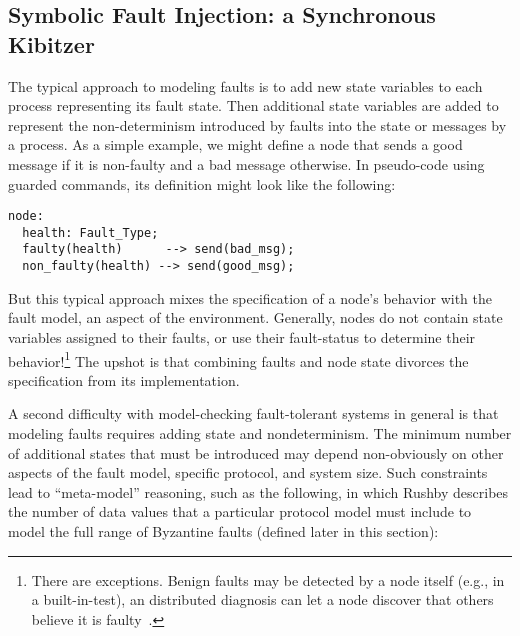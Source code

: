 \documentclass{llncs/llncs}
\newcommand{\lee}[1]{ } %
\newcommand{\lee}[1]{ {\color{blue}$<$lee: #1$>$} } %
\begin{document}

\subsection{Symbolic Fault Injection: a Synchronous Kibitzer}\label{sec:kibitzer}
The typical approach to modeling faults is to add new state variables to each process representing its fault state. Then additional state variables are added to represent the non-determinism introduced by faults into the state or messages by a process. As a simple example, we might define a node that sends a good message if it is non-faulty and a bad message otherwise. In pseudo-code using guarded commands, its definition might look like the following:

\small
\begin{verbatim}
node:
  health: Fault_Type;
  faulty(health)      --> send(bad_msg);
  non_faulty(health) --> send(good_msg);
\end{verbatim}
\normalsize


\noindent
But this typical approach mixes the specification of a node's behavior with the fault model, an aspect of the environment. Generally, nodes do not contain state variables assigned to their faults, or use their fault-status to determine their behavior!\footnote{There are exceptions. Benign faults may be detected by a node itself (e.g., in a built-in-test), an distributed diagnosis can let a node discover that others believe it is faulty~\cite{}.} The upshot is that combining faults and node state divorces the specification from its implementation.

A second difficulty with model-checking fault-tolerant systems in general is that modeling faults requires adding state and nondeterminism. The minimum number of additional states that must be introduced may depend non-obviously on other aspects of the fault model, specific protocol, and system size. Such constraints lead to ``meta-model'' reasoning, such as the following, in which Rushby describes the number of data values that a particular protocol model must include to model the full range of Byzantine faults (defined later in this section):
\end{document}
